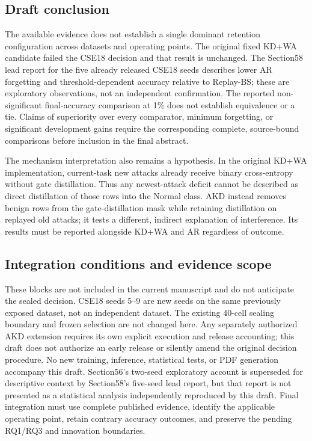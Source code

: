 \subsection*{Draft conclusion}
The available evidence does not establish a single dominant retention
configuration across datasets and operating points. The original fixed
KD+WA candidate failed the CSE18 decision and that result is unchanged.
The Section58 lead report for the five already released CSE18 seeds
describes lower AR forgetting and threshold-dependent accuracy relative
to Replay-BS; these are exploratory observations, not an independent
confirmation. The reported non-significant final-accuracy comparison at
1\% does not establish equivalence or a tie. Claims of superiority over
every comparator, minimum forgetting, or significant development gains
require the corresponding complete, source-bound comparisons before
inclusion in the final abstract.

The mechanism interpretation also remains a hypothesis. In the original
KD+WA implementation, current-task new attacks already receive binary
cross-entropy without gate distillation. Thus any newest-attack deficit
cannot be described as direct distillation of those rows into the Normal
class. AKD instead removes benign rows from the gate-distillation mask
while retaining distillation on replayed old attacks; it tests a different,
indirect explanation of interference. Its results must be reported
alongside KD+WA and AR regardless of outcome.

\subsection*{Integration conditions and evidence scope}
These blocks are not included in the current manuscript and do not
anticipate the sealed decision. CSE18 seeds 5--9 are new seeds on the same
previously exposed dataset, not an independent dataset. The existing
40-cell sealing boundary and frozen selection are not changed here.
Any separately authorized AKD extension requires its own explicit
execution and release accounting; this draft does not authorize an early
release or silently amend the original decision procedure.
No new training, inference, statistical tests, or PDF generation accompany
this draft. Section56's two-seed exploratory account is superseded for
descriptive context by Section58's five-seed lead report, but that report
is not presented as a statistical analysis independently reproduced by
this draft. Final integration must use complete published evidence,
identify the applicable operating point, retain contrary accuracy
outcomes, and preserve the pending RQ1/RQ3 and innovation boundaries.
